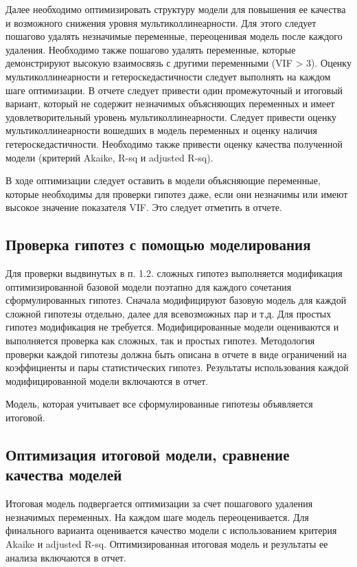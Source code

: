 \documentclass[12pt]{article}
\begin{document}
Далее необходимо оптимизировать структуру модели для повышения ее качества и
возможного снижения уровня мультиколлинеарности. Для этого следует пошагово удалять
незначимые переменные, переоценивая модель после каждого удаления. Необходимо
также пошагово удалять переменные, которые демонстрируют высокую взаимосвязь с
другими переменными (VIF > 3). Оценку мультиколлинеарности и гетероскедастичности
следует выполнять на каждом шаге оптимизации. В отчете следует привести один
промежуточный и итоговый вариант, который не содержит незначимых объясняющих
переменных и имеет удовлетворительный уровень мультиколлинеарности. Следует
привести оценку мультиколлинеарности вошедших в модель переменных и оценку
наличия гетероскедастичности. Необходимо также привести оценку качества полученной
модели (критерий Akaike, R-sq и adjusted R-sq).

В ходе оптимизации следует оставить в модели объясняющие переменные, которые
необходимы для проверки гипотез даже, если они незначимы или имеют высокое
значение показателя VIF. Это следует отметить в отчете.

\subsection{Проверка гипотез с помощью моделирования}
Для проверки выдвинутых в п. 1.2. сложных гипотез выполняется модификация
оптимизированной базовой модели поэтапно для каждого сочетания сформулированных
гипотез. Сначала модифицируют базовую модель для каждой сложной гипотезы отдельно,
далее для всевозможных пар и т.д. Для простых гипотез модификация не требуется.
Модифицированные модели оцениваются и выполняется проверка как сложных, так и
простых гипотез. Методология проверки каждой гипотезы должна быть описана в отчете в
виде ограничений на коэффициенты и пары статистических гипотез. Результаты
использования каждой модифицированной модели включаются в отчет.

Модель, которая учитывает все сформулированные гипотезы объявляется итоговой.
\subsection{Оптимизация итоговой модели, сравнение качества моделей}
Итоговая модель подвергается оптимизации за счет пошагового удаления
незначимых переменных. На каждом шаге модель переоценивается. Для финального
варианта оценивается качество модели с использованием критерия Akaike и adjusted R-sq.
Оптимизированная итоговая модель и результаты ее анализа включаются в отчет.
\end{document}
